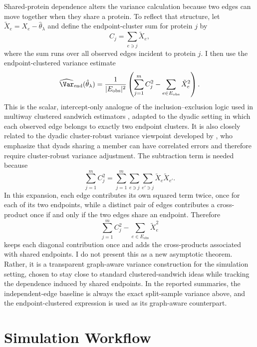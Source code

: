 Shared-protein dependence alters the variance calculation because two edges can move together when they share a protein. To reflect that structure, let \(\tilde X_e = X_e - \hat\theta_{\lambda}\) and define the endpoint-cluster sum for protein \(j\) by
\[
C_j = \sum_{e\ni j} \tilde X_e,
\]
where the sum runs over all observed edges incident to protein $j$. I then use the endpoint-clustered variance estimate
\[
\widehat{\Var}_{\mathrm{end}}(\hat\theta_{\lambda})
=
\frac{1}{|E_{\mathrm{obs}}|^2}
\left(
\sum_{j=1}^{m} C_j^2 - \sum_{e\in E_{\mathrm{obs}}} \tilde X_e^2
\right).
\]
This is the scalar, intercept-only analogue of the inclusion--exclusion logic used in multiway clustered sandwich estimators \parencite{cameron2011multiway}, adapted to the dyadic setting in which each observed edge belongs to exactly two endpoint clusters. It is also closely related to the dyadic cluster-robust variance viewpoint developed by \textcite{aronow2015dyadic}, who emphasize that dyads sharing a member can have correlated errors and therefore require cluster-robust variance adjustment. The subtraction term is needed because
\[
\sum_{j=1}^{m} C_j^2
=
\sum_{j=1}^{m}\sum_{e\ni j}\sum_{e'\ni j} \tilde X_e \tilde X_{e'}.
\]
In this expansion, each edge contributes its own squared term twice, once for each of its two endpoints, while a distinct pair of edges contributes a cross-product once if and only if the two edges share an endpoint. Therefore
\[
\sum_{j=1}^{m} C_j^2 - \sum_{e\in E_{\mathrm{obs}}} \tilde X_e^2
\]
keeps each diagonal contribution once and adds the cross-products associated with shared endpoints. I do not present this as a new asymptotic theorem. Rather, it is a transparent graph-aware variance construction for the simulation setting, chosen to stay close to standard clustered-sandwich ideas while tracking the dependence induced by shared endpoints. In the reported summaries, the independent-edge baseline is always the exact split-sample variance above, and the endpoint-clustered expression is used as its graph-aware counterpart.

\section{Simulation Workflow}

